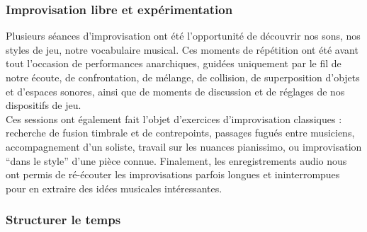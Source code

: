 \subsubsection{Improvisation libre et expérimentation}

\noindent Plusieurs séances d'improvisation ont été l'opportunité de découvrir nos sons, nos styles de jeu, notre vocabulaire musical. Ces moments de répétition ont été avant tout l'occasion de performances anarchiques, guidées uniquement par le fil de notre écoute, de confrontation, de mélange, de collision, de superposition d'objets et d'espaces sonores, ainsi que de moments de discussion et de réglages de nos dispositifs de jeu.\\
\indent Ces sessions ont également fait l'objet d'exercices d'improvisation classiques : recherche de fusion timbrale et de contrepoints, passages fugués entre musiciens, accompagnement d'un soliste, travail sur les nuances pianissimo, ou improvisation ``dans le style'' d'une pièce connue. Finalement, les enregistrements audio nous ont permis de ré-écouter les improvisations parfois longues et ininterrompues pour en extraire des idées musicales intéressantes.\\

\subsubsection{Structurer le temps}

